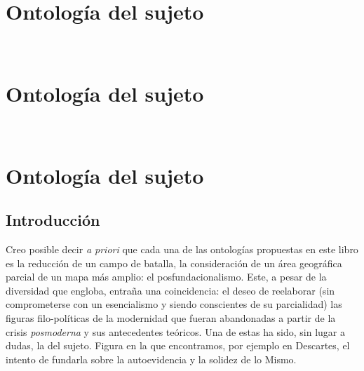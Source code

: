 \ifPDF
\chapter[\hspace{1.5pc}Ontología del sujeto]{Ontología del sujeto}
\setcounter{PrimPag}{\theCurrentPage}
\begin{center}
	\\
	\vspace{15mm}
\end{center}
\fi

\ifBNPDF
\chapter[\hspace{1.5pc}Ontología del sujeto]{Ontología del sujeto}
\begin{center}
	\\
	\vspace{15mm}
\end{center}
\fi

\ifHTMLEPUB
\chapter{Ontología del sujeto}
\fi

\section{Introducción}

Creo posible decir \emph{a priori} que cada una de las ontologías propuestas en este libro es la reducción de un campo de batalla, la consideración de un área geográfica parcial de un mapa más amplio: el posfundacionalismo. Este, a pesar de la diversidad que engloba, entraña una coincidencia: el deseo de reelaborar (sin comprometerse con un esencialismo y siendo conscientes de su parcialidad) las figuras filo-políticas de la modernidad que fueran abandonadas a partir de la crisis \emph{posmoderna} y sus antecedentes teóricos. Una de estas ha sido, sin lugar a dudas, la del sujeto. Figura en la que encontramos, por ejemplo en Descartes, el intento de fundarla sobre la autoevidencia y la solidez de lo Mismo.

